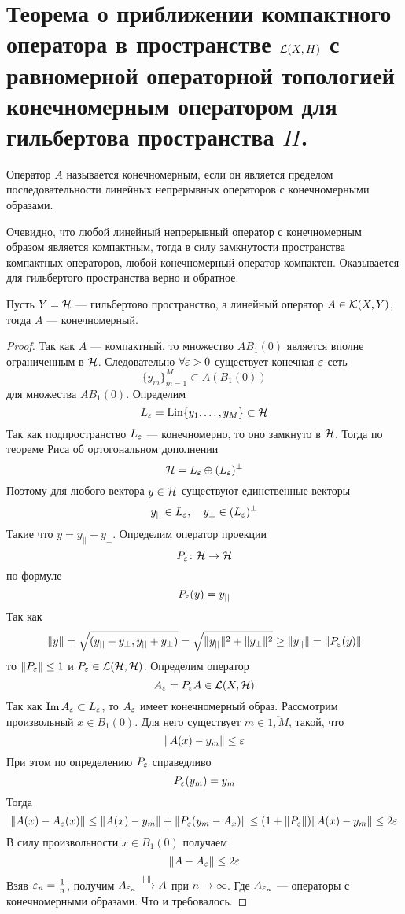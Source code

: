 \newpage
\section{Теорема о приближении компактного оператора в пространстве $\mathcal{L}(X,H)$ с равномерной операторной топологией конечномерным оператором для гильбертова пространства $H$. }
\begin{definition}
	Оператор $A$ называется конечномерным, если он является пределом последовательности линейных непрерывных операторов с конечномерными образами. 
\end{definition}
Очевидно, что любой линейный непрерывный оператор с конечномерным образом является компактным, тогда в силу замкнутости пространства компактных операторов, любой конечномерный оператор компактен. Оказывается для гильбертого пространства верно и обратное. 

\begin{theorem}
	Пусть $Y = \mathcal{H}$ --- гильбертово пространство, а линейный оператор $A \in \mathcal{K}(X,Y)$, тогда $A$ --- конечномерный.
\end{theorem}
\begin{proof}
	Так как $A$ --- компактный, то множество $AB_1(0)$ является вполне ограниченным в $\mathcal{H}$. Следовательно $\forall \varepsilon > 0$ существует конечная $\varepsilon$-сеть 
	$$
	\{y_m\}_{m=1}^M \subset A(B_1(0))
	$$
	для множества $AB_1(0)$. Определим 
	$$
	L_\varepsilon = \operatorname{Lin} \{y_1, \dots, y_M\} \subset \mathcal{H}
	$$
	Так как подпространство $L_\varepsilon$ --- конечномерно, то оно замкнуто в $\mathcal{H}$. Тогда по теореме Риса об ортогональном дополнении 
	$$
	\mathcal{H} = L_\varepsilon \oplus (L_\varepsilon)^\perp
	$$
	Поэтому для любого вектора $y \in \mathcal{H}$ существуют единственные векторы 
	$$
	y_{||} \in L_\varepsilon, \quad y_\perp \in (L_\varepsilon)^\perp
	$$
	Такие что $y = y_{||} + y_\perp$. Определим оператор проекции 
	$$
	P_\varepsilon \colon \mathcal{H} \to \mathcal{H}
	$$
	по формуле 
	$$
	P_\varepsilon(y) = y_{||}
	$$
	Так как
	$$
	\|y\| = \sqrt{(y_{||} + y_\perp,y_{||} + y_\perp)}= \sqrt{\|y_{||}\|^2 + \|y_\perp\|^2} \geq \|y_{||}\| = \|P_\varepsilon(y)\|
	$$
	то $\|P_\varepsilon\| \leq 1$ и $P_\varepsilon \in \mathcal{L}(\mathcal{H},\mathcal{H})$. Определим оператор 
	$$
	A_\varepsilon = P_\varepsilon A \in \mathcal{L}(X, \mathcal{H})
	$$
	Так как $\operatorname{Im} A_\varepsilon \subset L_\varepsilon$, то $A_\varepsilon$ имеет конечномерный образ. Рассмотрим произвольный $x \in B_1(0)$. Для него существует $m \in \overline{1, M}$, такой, что 
	$$
	\|A(x) - y_m\| \leq \varepsilon
	$$
	При этом по определению $P_\varepsilon$ справедливо 
	$$
	P_\varepsilon(y_m) = y_m
	$$
	Тогда 
	$$
	\|A(x) - A_\varepsilon(x)\| \leq \|A(x) - y_m\| + \|P_\varepsilon(y_m - A_x)\| \leq (1 + \|P_\varepsilon\|)\|A(x) - y_m\| \leq 2\varepsilon
	$$
	В силу произвольности $x \in B_1(0)$ получаем 
	$$
	\|A - A_\varepsilon\| \leq 2\varepsilon
	$$
	Взяв $\varepsilon_n = \frac{1}{n}$, получим  $A_{\varepsilon_n} \xrightarrow{\|\|} A$ при $n \to \infty$. Где $A_{\varepsilon_n}$ --- операторы с конечномерными образами. Что и требовалось.
\end{proof}
